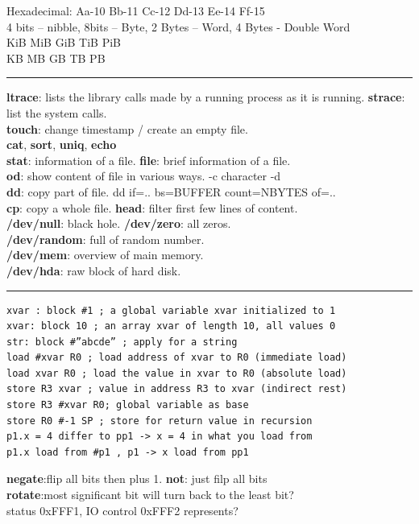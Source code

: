 \documentclass[8pt,a4paper,landscape]{article}
\begin{document}
\small
\begin{spacing}{-1}
\begin{multicols*}{3}
    \noindent
    Hexadecimal: Aa-10  Bb-11  Cc-12  Dd-13  Ee-14  Ff-15 \\
    4 bits – nibble, 8bits – Byte, 2 Bytes – Word, 4 Bytes - Double Word\\
    KiB MiB GiB TiB PiB \\
    KB MB GB TB PB  \\
    \hrule \noindent
    \textbf{ltrace}: lists the library calls made by a running process as it is running. 
    \textbf{strace}: list the system calls.  \\
    \textbf{touch}: change timestamp / create an empty file. \\
    \textbf{cat}, \textbf{sort}, \textbf{uniq}, \textbf{echo} \\
    \textbf{stat}: information of a file. \textbf{file}: brief information of a file.\\
    \textbf{od}: show content of file in various ways. -c character -d \\
    \textbf{dd}: copy part of file. dd if=.. bs=BUFFER count=NBYTES of=.. \\
    \textbf{cp}: copy a whole file. \textbf{head}: filter first few lines of content. \\
    \textbf{/dev/null}: black hole. \textbf{/dev/zero}: all zeros. \\
    \textbf{/dev/random}: full of random number. \\
    \textbf{/dev/mem}: overview of main memory. \\
    \textbf{/dev/hda}: raw block of hard disk. \\
    \hrule \noindent
\vspace*{-2mm}
\begin{verbatim}
xvar : block #1 ; a global variable xvar initialized to 1
xvar: block 10 ; an array xvar of length 10, all values 0
str: block #”abcde” ; apply for a string
load #xvar R0 ; load address of xvar to R0 (immediate load)
load xvar R0 ; load the value in xvar to R0 (absolute load)
store R3 xvar ; value in address R3 to xvar (indirect rest)
store R3 #xvar R0; global variable as base 
store R0 #-1 SP ; store for return value in recursion
p1.x = 4 differ to pp1 -> x = 4 in what you load from
p1.x load from #p1 , p1 -> x load from pp1  \end{verbatim}
\vspace*{-3mm}
    \textbf{negate}:flip all bits then plus 1. \textbf{not}: just filp all bits \\
    \textbf{rotate}:most significant bit will turn back to the least bit? \\
    status 0xFFF1, IO control 0xFFF2 represents? \\


\end{multicols*}
\end{spacing}
\end{document}
